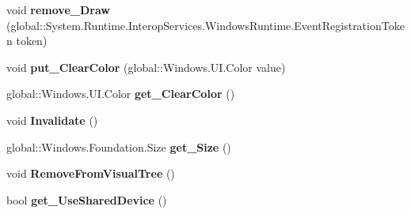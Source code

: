 \begin{DoxyCompactItemize}
\mbox{\label{class_microsoft_1_1_graphics_1_1_canvas_1_1_u_i_1_1_xaml_1_1_canvas_control_ad2a843f823ae97fdab81ae2b2e2564fa}} 
void {\bfseries remove\+\_\+\+Draw} (global\+::\+System.\+Runtime.\+Interop\+Services.\+Windows\+Runtime.\+Event\+Registration\+Token token)
\item 
\mbox{\label{class_microsoft_1_1_graphics_1_1_canvas_1_1_u_i_1_1_xaml_1_1_canvas_control_ac45e4aa28ab4d2147741f75260781cfa}} 
void {\bfseries put\+\_\+\+Clear\+Color} (global\+::\+Windows.\+U\+I.\+Color value)
\item 
\mbox{\label{class_microsoft_1_1_graphics_1_1_canvas_1_1_u_i_1_1_xaml_1_1_canvas_control_ac1780376dd163f47f7d16e7470b4e96f}} 
global\+::\+Windows.\+U\+I.\+Color {\bfseries get\+\_\+\+Clear\+Color} ()
\item 
\mbox{\label{class_microsoft_1_1_graphics_1_1_canvas_1_1_u_i_1_1_xaml_1_1_canvas_control_a4676af3dd8e8a8a5bedabb4a172949db}} 
void {\bfseries Invalidate} ()
\item 
\mbox{\label{class_microsoft_1_1_graphics_1_1_canvas_1_1_u_i_1_1_xaml_1_1_canvas_control_a49e67369dc1fe3f019a64f6fdd0342cb}} 
global\+::\+Windows.\+Foundation.\+Size {\bfseries get\+\_\+\+Size} ()
\item 
\mbox{\label{class_microsoft_1_1_graphics_1_1_canvas_1_1_u_i_1_1_xaml_1_1_canvas_control_af9c6b8f3ff29e316e100e88d7589504e}} 
void {\bfseries Remove\+From\+Visual\+Tree} ()
\item 
\mbox{\label{class_microsoft_1_1_graphics_1_1_canvas_1_1_u_i_1_1_xaml_1_1_canvas_control_a60b81107044570bfbd0172ea06746e1a}} 
bool {\bfseries get\+\_\+\+Use\+Shared\+Device} ()
\item 
\mbox{\label{class_microsoft_1_1_graphics_1_1_canvas_1_1_u_i_1_1_xaml_1_1_canvas_control_afca7bdc3fc83df242ce81d1c39623cea}} 

\end{DoxyCompactItemize}
